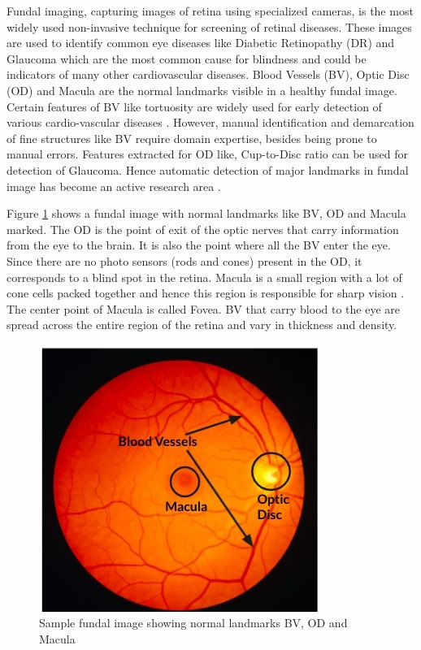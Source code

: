 \documentclass[utf8]{FrontiersinHarvard} %
\begin{document}
Fundal imaging, capturing images of retina using specialized cameras, is the most widely used non-invasive technique for screening of retinal diseases. These images are used to identify common eye diseases like Diabetic Retinopathy (DR) \cite{hu2015curbing} and Glaucoma which are the most common cause for blindness and could be indicators of many other cardiovascular diseases. Blood Vessels (BV), Optic Disc (OD) and Macula are the normal landmarks visible in a healthy fundal image. Certain features of BV like tortuosity are widely used for early detection of various cardio-vascular diseases \cite{krestanova2020recent}. However, manual identification and demarcation of fine structures like BV require domain expertise, besides being prone to manual errors. Features extracted for OD like, Cup-to-Disc ratio can be used for detection of Glaucoma. Hence automatic detection of major landmarks in fundal image has become an active research area \cite{kou2020enhanced,guo2020bin,nur2018exudate,jiang2018retinal, joshua2020blood, dash2020retinal}.

Figure \ref{fig:sample_funal_image} shows a fundal image with normal landmarks like BV, OD and Macula marked. The OD is the point of exit of the optic nerves that carry information from the eye to the brain. It is also the point where all the BV enter the eye. Since there are no photo sensors (rods and cones) present in the OD, it corresponds to a blind spot in the retina. Macula is a small region with a lot of cone cells packed together and hence this region is responsible for sharp vision \cite{maculaurl}. The center point of Macula is called Fovea. BV that carry blood to the eye are spread across the entire region of the retina and vary in thickness and density.

\begin{figure}
\centering
\includegraphics[width=0.5\linewidth]{images/fundal_fovea_bv_od.jpg}
\caption{Sample fundal image showing normal landmarks BV, OD and Macula}
\label{fig:sample_funal_image}
\end{figure}
\end{document}
